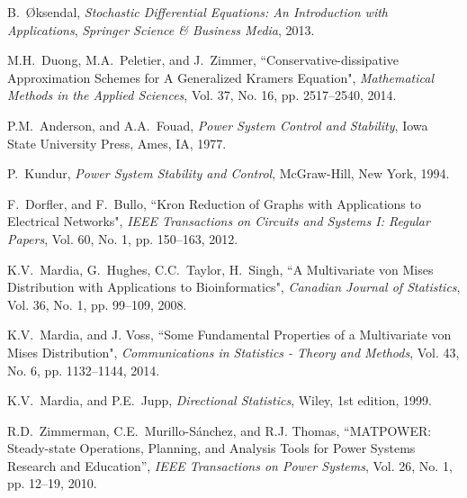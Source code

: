 \documentclass[10pt,twocolumn]{IEEEtran}
\begin{document}
\begin{thebibliography}{99}

B.~\O{}ksendal, \emph{Stochastic Differential Equations: An Introduction with Applications}, \emph{Springer Science \& Business Media}, 2013.




M.H.~Duong, M.A.~Peletier, and J.~Zimmer, ``Conservative-dissipative Approximation Schemes for A Generalized Kramers Equation", \emph{Mathematical Methods in the Applied Sciences}, Vol. 37, No. 16, pp. 2517--2540, 2014.


P.M.~Anderson, and A.A.~Fouad, \emph{Power System Control and Stability}, Iowa State University Press, Ames, IA, 1977.

P.~Kundur, \emph{Power System Stability and Control}, McGraw-Hill, New York, 1994.


F.~Dorfler, and F.~Bullo, ``Kron Reduction of Graphs with Applications to Electrical Networks", \emph{IEEE Transactions on Circuits and Systems I: Regular Papers}, Vol. 60, No. 1, pp. 150--163, 2012.

K.V.~Mardia, G.~Hughes, C.C.~Taylor, H.~Singh, ``A Multivariate von Mises Distribution with Applications to Bioinformatics", \emph{Canadian Journal of Statistics}, Vol. 36, No. 1, pp. 99--109, 2008.

K.V.~Mardia, and J. Voss, ``Some Fundamental Properties of a
Multivariate von Mises Distribution", \emph{Communications in Statistics - Theory and Methods}, Vol. 43, No. 6, pp. 1132--1144, 2014.

K.V.~Mardia, and P.E.~Jupp, \emph{Directional Statistics}, Wiley, 1st edition, 1999.

R.D.~Zimmerman, C.E.~Murillo-S{\'a}nchez, and R.J. Thomas, ``MATPOWER: Steady-state Operations, Planning, and Analysis Tools for Power Systems Research and Education'', \emph{IEEE Transactions on Power Systems},  Vol. 26, No. 1, pp. 12--19, 2010.


\end{thebibliography}
\end{document}
